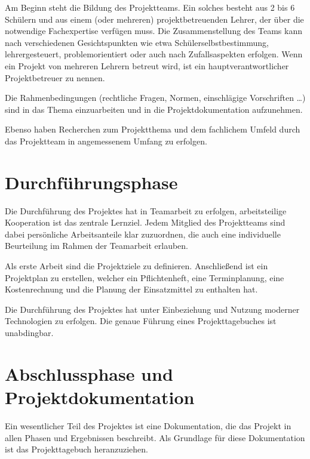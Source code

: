 Am Beginn steht die Bildung des Projektteams. Ein solches besteht aus 2 bis 6 Schülern und aus einem (oder mehreren) projektbetreuenden Lehrer, der über die notwendige Fachexpertise verfügen muss. Die Zusammenstellung des Teams kann nach verschiedenen Gesichtspunkten wie etwa Schülerselbstbestimmung, lehrergesteuert, problemorientiert oder auch nach Zufallsaspekten erfolgen. Wenn ein Projekt von mehreren Lehrern betreut wird, ist ein hauptverantwortlicher Projektbetreuer zu nennen.

Die Rahmenbedingungen (rechtliche Fragen, Normen, einschlägige Vorschriften \ldots) sind in das Thema einzuarbeiten und in die Projektdokumentation aufzunehmen.

Ebenso haben Recherchen zum Projektthema und dem fachlichem Umfeld durch das Projektteam in angemessenem Umfang zu erfolgen.


\section{Durchführungsphase}

Die Durchführung des Projektes hat in Teamarbeit zu erfolgen, arbeitsteilige Kooperation ist das zentrale Lernziel. Jedem Mitglied des Projektteams sind dabei persönliche Arbeitsanteile klar zuzuordnen, die auch eine individuelle Beurteilung im Rahmen der Teamarbeit erlauben.

Als erste Arbeit sind die Projektziele zu definieren. Anschließend ist ein Projektplan zu erstellen, welcher ein Pflichtenheft, eine Terminplanung, eine Kostenrechnung und die Planung der Einsatzmittel zu enthalten hat.

Die Durchführung des Projektes hat unter Einbeziehung und Nutzung moderner Technologien zu erfolgen. Die genaue Führung eines Projekttagebuches ist unabdingbar.


\section{Abschlussphase und Projektdokumentation}

Ein wesentlicher Teil des Projektes ist eine Dokumentation, die das Projekt in allen Phasen und Ergebnissen beschreibt. Als Grundlage für diese Dokumentation ist das Projekttagebuch heranzuziehen.

